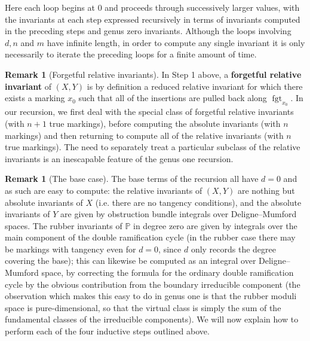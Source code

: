 \documentclass[11pt]{amsart}
\newcommand{\fgt}{\operatorname{fgt}}
\theoremstyle{definition}
\theoremstyle{definition}
\newtheorem{remark}[thm]{Remark}
\begin{document}
\begin{algorithm}[H]
\DontPrintSemicolon
{}
\end{algorithm}\bigskip

\noindent Here each loop begins at $0$ and proceeds through successively larger values, with the invariants at each step expressed recursively in terms of invariants computed in the preceding steps and genus zero invariants. Although the loops involving $d, n$ and $m$ have infinite length, in order to compute any single invariant it is only necessarily to iterate the preceding loops for a finite amount of time.

\begin{remark}[Forgetful relative invariants] In Step 1 above, a \textbf{forgetful relative invariant} of $(X,Y)$ is by definition a reduced relative invariant for which there exists a marking $x_0$ such that all of the insertions are pulled back along $\fgt_{x_0}$. In our recursion, we first deal with the special class of forgetful relative invariants (with $n+1$ true markings), before computing the absolute invariants (with $n$ markings) and then returning to compute all of the relative invariants (with $n$ true markings). The need to separately treat a particular subclass of the relative invariants is an inescapable feature of the genus one recursion.\end{remark}

\begin{remark}[The base case]
The base terms of the recursion all have $d=0$ and as such are easy to compute: the relative invariants of $(X,Y)$ are nothing but absolute invariants of $X$ (i.e. there are no tangency conditions), and the absolute invariants of $Y$ are given by obstruction bundle integrals over Deligne--Mumford spaces. The rubber invariants of $\mathbb{P}$ in degree zero are given by integrals over the main component of the double ramification cycle (in the rubber case there may be markings with tangency even for $d=0$, since $d$ only records the degree covering the base); this can likewise be computed as an integral over Deligne--Mumford space, by correcting the formula for the ordinary double ramification cycle \cite{Hain,JPPZ} by the obvious contribution from the boundary irreducible component (the observation which makes this easy to do in genus one is that the rubber moduli space is pure-dimensional, so that the virtual class is simply the sum of the fundamental classes of the irreducible components). We will now explain how to perform each of the four inductive steps outlined above.\end{remark}
\end{document}
